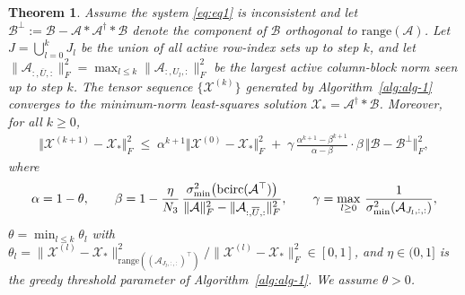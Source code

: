 \documentclass[11pt]{article}
\newtheorem{theorem}{Theorem}[section]
\def\fm#1{\mathcal{#1}}
\begin{document}
\begin{theorem}
Assume the system \eqref{eq:eq1} is inconsistent and let
$\fm B^\perp := \fm B - \fm A * \fm A^\dagger * \fm B$
denote the component of $\fm B$ orthogonal to $\mathrm{range}(\fm A)$.
Let $J = \bigcup_{l=0}^{k} J_l$ be the union of all active row-index sets up to step $k$,
and let $\|\fm A_{:,\overline{U},:}\|_F^2 = \max_{l \leq k}\|\fm A_{:,U_l,:}\|_F^2$
be the largest active column-block norm seen up to step $k$.
The tensor sequence $\{\fm X^{(k)}\}$ generated by Algorithm~\ref{alg:alg-1}
converges to the minimum-norm least-squares solution $\fm X_\ast = \fm A^\dagger * \fm B$.
Moreover, for all $k \geq 0$,
\begin{align}
    \Vert \fm X^{(k+1)} - \fm X_\ast \Vert_F^2
    \;\leq\;
    \alpha^{k+1}\Vert \fm X^{(0)} - \fm X_\ast \Vert_F^2
    \;+\;
    \gamma\,\frac{\alpha^{k+1}-\beta^{k+1}}{\alpha - \beta}
    \cdot\beta
    \,\Vert \fm B - \fm B^\perp \Vert_F^2,
\end{align}
where
\begin{align*}
\alpha = 1 - \theta,
\qquad
\beta  = 1 - \frac{\eta}{N_3}\,
    \frac{\sigma_{\min}^2\!\left(\bcirc(\fm A^\top)\right)}
         {\|\fm A\|_F^2 - \|\fm A_{:,\overline{U},:}\|_F^2},
\qquad
\gamma = \max_{l \geq 0}\,\frac{1}{\sigma_{\min}^2\!\left(\fm A_{J_l,:,:}\right)},
\end{align*}
$\theta = \min_{l \leq k}\theta_l$ with
$\theta_l = \|\fm X^{(l)} - \fm X_\ast\|^2_{\mathrm{range}((\fm A_{J_l,:,:})^\top)}\big/
            \|\fm X^{(l)} - \fm X_\ast\|_F^2 \in [0,1]$,
and $\eta \in (0,1]$ is the greedy threshold parameter of Algorithm~\ref{alg:alg-1}.
We assume $\theta > 0$.
\end{theorem}
\end{document}
